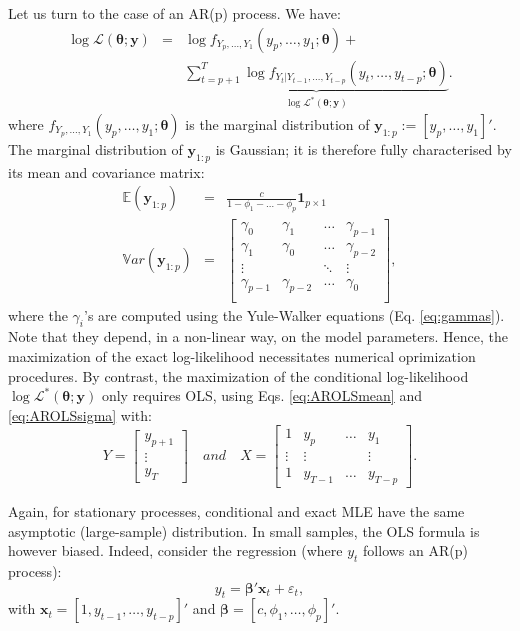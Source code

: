 \documentclass[
  12pt,
]{book}
\theoremstyle{definition}
\theoremstyle{definition}
\theoremstyle{definition}
\theoremstyle{definition}
\theoremstyle{remark}
\begin{document}
Let us turn to the case of an AR(p) process. We have:
\begin{eqnarray*}
\log \mathcal{L}(\boldsymbol\theta;\mathbf{y}) &=& \log f_{Y_p,\dots,Y_1}(y_p,\dots,y_1;\boldsymbol\theta) +\\
&& \underbrace{\sum_{t=p+1}^{T} \log f_{Y_t|Y_{t-1},\dots,Y_{t-p}}(y_t,\dots,y_{t-p};\boldsymbol\theta)}_{\log \mathcal{L}^*(\boldsymbol\theta;\mathbf{y})}.
\end{eqnarray*}
where \(f_{Y_p,\dots,Y_{1}}(y_p,\dots,y_{1};\boldsymbol\theta)\) is the marginal distribution of \(\mathbf{y}_{1:p} := [y_p,\dots,y_1]'\). The marginal distribution of \(\mathbf{y}_{1:p}\) is Gaussian; it is therefore fully characterised by its mean and covariance matrix:
\begin{eqnarray*}
\mathbb{E}(\mathbf{y}_{1:p})&=&\frac{c}{1-\phi_1-\dots-\phi_p} \mathbf{1}_{p\times 1} \\
\mathbb{V}ar(\mathbf{y}_{1:p}) &=& \left[\begin{array}{cccc}
\gamma_0 & \gamma_1 & \dots & \gamma_{p-1} \\
\gamma_1 & \gamma_0 & \dots & \gamma_{p-2} \\
\vdots &  & \ddots & \vdots \\
\gamma_{p-1} & \gamma_{p-2} & \dots & \gamma_{0} \\
\end{array}\right],
\end{eqnarray*}
where the \(\gamma_i\)'s are computed using the Yule-Walker equations (Eq. \eqref{eq:gammas}). Note that they depend, in a non-linear way, on the model parameters. Hence, the maximization of the exact log-likelihood necessitates numerical oprimization procedures. By contrast, the maximization of the conditional log-likelihood \(\log \mathcal{L}^*(\boldsymbol\theta;\mathbf{y})\) only requires OLS, using Eqs. \eqref{eq:AROLSmean} and \eqref{eq:AROLSsigma} with:
\[
Y = \left[\begin{array}{c}
y_{p+1}\\
\vdots\\
y_T
\end{array}\right] \quad and \quad
X = \left[\begin{array}{cccc}
1 & y_p & \dots & y_1\\
\vdots&\vdots&&\vdots\\
1&y_{T-1}&\dots&y_{T-p}
\end{array}\right].
\]

Again, for stationary processes, conditional and exact MLE have the same asymptotic (large-sample) distribution. In small samples, the OLS formula is however biased. Indeed, consider the regression (where \(y_t\) follows an AR(p) process):
\begin{equation}
y_t = \boldsymbol\beta'\mathbf{x}_t + \varepsilon_t,\label{eq:OLSregARp}
\end{equation}
with \(\mathbf{x}_t = [1,y_{t-1},\dots,y_{t-p}]'\) and \(\boldsymbol\beta = [c,\phi_1,\dots,\phi_p]'\).
\end{document}
